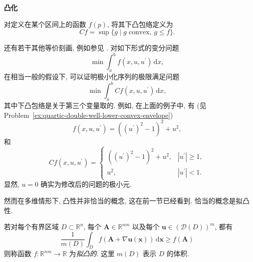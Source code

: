 \textbf{凸化}

\begin{Definition}
\label{def:lower-convex-envelope}
对定义在某个区间上的函数 $f(p)$, 将其下凸包络定义为
\begin{equation}\label{eq:lower-convex-envelope-definition}
Cf=\sup\{g\mid g\text{ convex},\ g\leq f\}.
\end{equation}

\end{Definition}

还有若干其他等价刻画, 例如参见 \cite{Dac}. 对如下形式的变分问题
\begin{equation}\label{eq:one-dimensional-unrelaxed-variational-problem}
\min\int_a^bf(x,u,u^{\prime})\,\mathrm{d}x,
\end{equation}
在相当一般的假设下, 可以证明极小化序列的极限满足问题
\begin{equation}\label{eq:one-dimensional-convexified-variational-problem}
\min\int_a^bCf(x,u,u^{\prime})\,\mathrm{d}x,
\end{equation}
其中下凸包络是关于第三个变量取的. 例如, 在上面的例子中, 有 (见 Problem~\ref{ex:quartic-double-well-lower-convex-envelope})
\begin{equation}\label{eq:nonconvex-model-integrand}
f(x,u,u^{\prime})=((u^{\prime})^2-1)^2+u^2,
\end{equation}
和
\begin{equation}\label{eq:nonconvex-model-lower-convex-envelope}
Cf(x,u,u^{\prime})=\begin{cases}((u^{\prime})^2-1)^2+u^2,&|u^{\prime}|\geq1,\\u^2,&|u^{\prime}|<1.\end{cases}
\end{equation}
显然, $u=0$ 确实为修改后的问题的极小元.

然而在多维情形下, 凸性并非恰当的概念, 这在前一节已经看到. 恰当的概念是拟凸性.

\begin{Definition}
\label{def:quasiconvex-function}
若对每个有界区域 $D\subset\mathbb{R}^n$, 每个 $\bm{A}\in\mathbb{R}^{nm}$ 以及每个 $\bm{u}\in(\mathcal{D}(D))^m$, 都有
\begin{equation}\label{eq:quasiconvex-function-integral-definition}
\dfrac{1}{m(D)}\int_Df(\bm{A}+\nabla\bm{u}(\bm{x}))\,\mathrm{d}\bm{x}\geq f(\bm{A})
\end{equation}
则称函数 $f:\mathbb{R}^{nm}\to\mathbb{R}$ 为\emph{拟凸的}. 这里 $m(D)$ 表示 $D$ 的体积.
\end{Definition}

